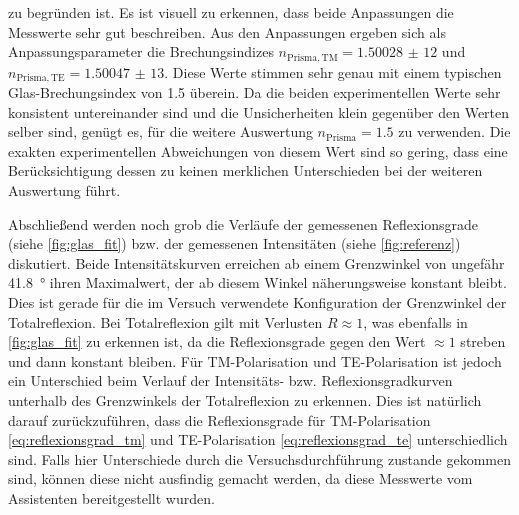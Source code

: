 zu begründen ist. Es ist visuell zu erkennen, dass beide Anpassungen die Messwerte sehr gut beschreiben. Aus den Anpassungen ergeben sich als Anpassungsparameter
die Brechungsindizes $n_{\mathrm{Prisma,TM}} = \num{1,50028(12)}$ und $n_{\mathrm{Prisma,TE}} = \num{1,50047(13)}$. Diese Werte stimmen sehr genau mit einem
typischen Glas-Brechungsindex von \num{1,5} überein. Da die beiden experimentellen Werte sehr konsistent untereinander sind und die Unsicherheiten klein gegenüber
den Werten selber sind, genügt es, für die weitere Auswertung $n_{\mathrm{Prisma}} = \num{1,5}$ zu verwenden. Die exakten experimentellen Abweichungen von diesem
Wert sind so gering, dass eine Berücksichtigung dessen zu keinen merklichen Unterschieden bei der weiteren Auswertung führt.\par
Abschließend werden noch grob die Verläufe der gemessenen Reflexionsgrade (siehe \cref{fig:glas_fit}) bzw. der gemessenen Intensitäten (siehe \cref{fig:referenz})
diskutiert. Beide Intensitätskurven erreichen ab einem Grenzwinkel von ungefähr \SI{41,8}{\degree} ihren Maximalwert, der ab diesem Winkel näherungsweise konstant bleibt.
Dies ist gerade für die im Versuch verwendete Konfiguration der Grenzwinkel der Totalreflexion. Bei Totalreflexion gilt mit Verlusten $R \approx 1$, was ebenfalls in \cref{fig:glas_fit}
zu erkennen ist, da die Reflexionsgrade gegen den Wert $\approx 1$ streben und dann konstant bleiben. Für TM-Polarisation und TE-Polarisation ist jedoch ein Unterschied
beim Verlauf der Intensitäts- bzw. Reflexionsgradkurven unterhalb des Grenzwinkels der Totalreflexion zu erkennen. Dies ist natürlich darauf zurückzuführen, dass
die Reflexionsgrade für TM-Polarisation \ref{eq:reflexionsgrad_tm} und TE-Polarisation \ref{eq:reflexionsgrad_te} unterschiedlich sind. Falls hier Unterschiede durch die
Versuchsdurchführung zustande gekommen sind, können diese nicht ausfindig gemacht werden, da diese Messwerte vom Assistenten bereitgestellt wurden.\newpage

